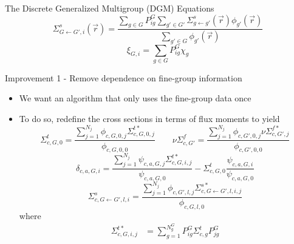 \documentclass[final]{beamer}
\begin{document}
\begin{frame}{}
\begin{columns}[t]
\begin{column}{.32\linewidth}
\begin{block}{The Discrete Generalized Multigroup (DGM) Equations}
\begin{equation*}
                    \Sigma^s_{G\gets G', i}(\vec{r}) 
                    = \frac{\sum\limits_{g\in G} P^G_{ig} \sum\limits_{g'\in G'} \Sigma^s_{g\gets g'}(\vec{r}) \phi_{g'}(\vec{r}) }
                        {\sum\limits_{g'\in G} \phi_{g'}(\vec{r}) }
                \end{equation*} 
                \begin{equation*}
                    \xi_{G,i} = \sum_{g\in G} P^G_{ig} \chi_g
                \end{equation*}
            \end{block}
            \begin{block}{Improvement 1 - Remove dependence on fine-group information}
                \begin{itemize}
                    \item We want an algorithm that only uses the fine-group data once
                    \item To do so, redefine the cross sections in terms of flux moments to yield
                    \begin{equation*}
                        \Sigma^t_{c, G, 0} 
                        = \frac{\sum\limits_{j=1}^{N_j}\phi_{c,G,0,j}\Sigma^{t*}_{c, G, 0, j}}{\phi_{c,G,0,0}}
                        \quad\text{}\quad
                        \nu\Sigma^f_{c,G'}
                        = \frac{\sum\limits_{j=1}^{N_j}\phi_{c,G',0,j}\nu\Sigma^{f*}_{c,G',j}}{\phi_{c, G', 0, 0}}
                    \end{equation*}
                    \begin{equation*}
                        \delta_{c,a,G,i}=\frac{\sum_{j=1}^{N_j}\psi_{c,a,G,j}\Sigma^{t*}_{c, G, i, j}}{\psi_{c,a,G,0}} - \Sigma^t_{c, G, 0}\frac{\psi_{c,a,G,i}}{\psi_{c,a,G,0}}
                    \end{equation*}
                    \begin{equation*}
                        \Sigma_{c,G\leftarrow G',l,i}^s
                        = \frac{\sum_{j=1}^{N_j}\phi_{c,G',l,j}\Sigma_{c,G\leftarrow G',l,i,j}^{s*}}{\phi_{c,G,l,0}}
                    \end{equation*}
                    where
                    \begin{equation*}
                        \begin{split}
                            \Sigma^{t*}_{c, G, i, j} &= \sum_{g=1}^{N_g^{G}}P_{ig}^G\Sigma^t_{c, g}P_{jg}^G\\

\end{split}
\end{equation*}
\end{itemize}
\end{block}
\end{column}
\end{columns}
\end{frame}
\end{document}
